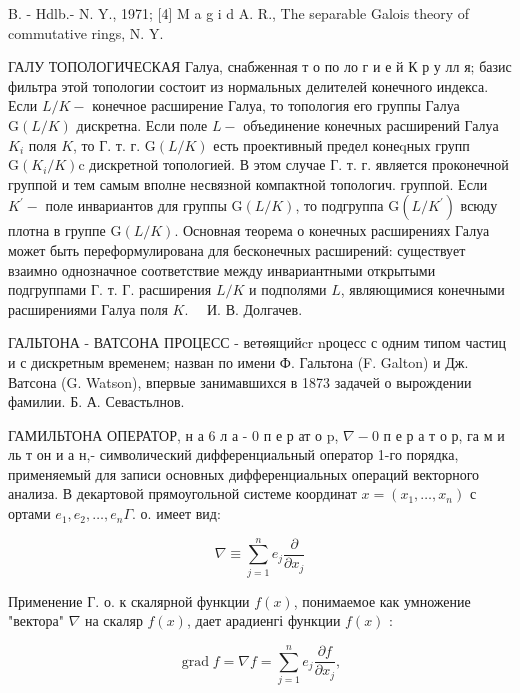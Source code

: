 \documentclass[10pt]{article}
\begin{document}
B. - Hdlb.- N. Y., 1971; [4] M a g i d A. R., The separable Galois theory of commutative rings, N. Y.



ГАЛУ ТОПОЛОГИЧЕСКАЯ Галуа, снабженная т о по ло г и е й К р у лл я; базис фильтра этой топологии состоит из нормальных делителей конечного индекса. Если $L / K-$ конечное расширение Галуа, то топология его группы Галуа $\mathrm{G}(L / K)$ дискретна. Если поле $L-$ объединение конечных расширений Галуа $K_{i}$ поля $K$, то Г. т. г. $\mathrm{G}(L / K)$ есть проективный предел конеqных групп $\mathrm{G}\left(K_{i} / K\right) \mathrm{c}$ дискретной топологией. В этом случае Г. т. г. является проконечной группой и тем самым вполне несвязной компактной топологич. группой. Если $K^{\prime}-$ поле инвариантов для группы $\mathrm{G}(L / K)$, то подгруппа $\mathrm{G}\left(L / K^{\prime}\right)$ всюду плотна в группе $\mathrm{G}(L / K)$. Основная теорема о конечных расширениях Галуа может быть переформулирована для бесконечных расширений: существует взаимно однозначное соответствие между инвариантными открытыми подгруппами Г. т. Г. расширения $L / K$ и подполями $L$, являющимися конечными расширениями Галуа поля $K . \quad$ И. В. Долгачев.



ГАЛЬТОНА - ВАТСОНА ПРОЦЕСС - ветөящийcr nроцесс с одним типом частиц и с дискретным временем; назван по имени Ф. Гальтона (F. Galton) и Дж. Ватсона (G. Watson), впервые занимавшихся в 1873 задачей о вырождении фамилии. Б. А. Севастьлнов.



ГАМИЛЬТОНА ОПЕРАТОР, н а 6 л а - 0 п е р ат о p, $\nabla-0$ п е р а т о р, га м и ль т он и а н,- символический дифференциальный оператор 1-го порядка, применяемый для записи основных дифференциальных операций векторного анализа. В декартовой прямоугольной системе координат $x=\left(x_{1}, \ldots, x_{n}\right)$ с ортами $e_{1}, e_{2}, \ldots, e_{n} \Gamma$. о. имеет вид:



\[

\nabla \equiv \sum_{j=1}^{n} e_{j} \frac{\partial}{\partial x_{j}}

\]



Применение Г. о. к скалярной функции $f(x)$, понимаемое как умножение "вектора" $\nabla$ на скаляр $f(x)$, дает арадиенгі функции $f(x)$ :



\[

\operatorname{grad} f=\nabla f=\sum_{j=1}^{n} e_{j} \frac{\partial f}{\partial x_{j}},

\]
\end{document}
